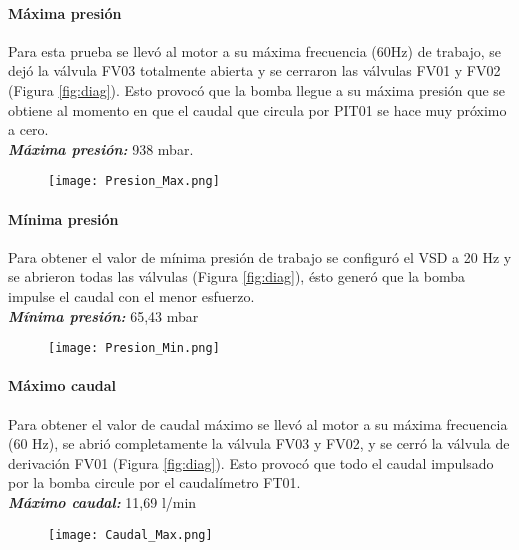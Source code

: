 {\paragraph{Máxima presión}

Para esta prueba se llevó al motor a su máxima frecuencia (60Hz) de trabajo, se dejó la válvula FV03 totalmente abierta y se cerraron las válvulas FV01 y FV02 (Figura  \ref{fig:diag}). Esto provocó que la bomba llegue a su máxima presión que se obtiene al momento en que el caudal que circula por PIT01 se hace muy próximo a cero.\\
\textbf{\textit{Máxima presión:}} 938 mbar.
\begin{figure}[h!]
	\centering
	\texttt{[image: Presion\_Max.png]}
	\label{fig:PMAX}
\end{figure}

\paragraph{Mínima presión}
Para obtener el valor de mínima presión de trabajo se configuró el VSD a 20 Hz y se abrieron todas las válvulas (Figura  \ref{fig:diag}), ésto generó que la bomba impulse el caudal con el menor esfuerzo. \\
\textbf{\textit{Mínima presión:}} 65,43 mbar
\begin{figure}[h!]
	\centering
	\texttt{[image: Presion\_Min.png]}
	\label{fig:Pmin}
\end{figure}

\paragraph{Máximo caudal}
Para obtener el valor de caudal máximo se llevó al motor a su máxima frecuencia (60 Hz), se abrió completamente la válvula FV03 y FV02, y se cerró la válvula de derivación FV01 (Figura  \ref{fig:diag}).
Esto provocó que todo el caudal impulsado por la bomba circule por el caudalímetro FT01.\\
\textbf{\textit{Máximo caudal: }}11,69 l/min
\begin{figure}[h!]
	\centering
	\texttt{[image: Caudal\_Max.png]}
	\label{fig:CM}
\end{figure}




}
